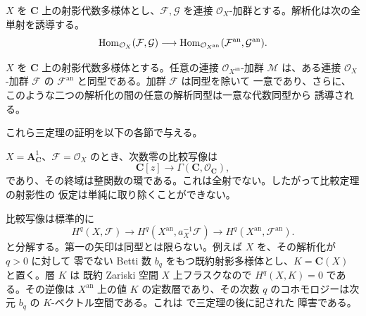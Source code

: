 \begin{theorem}[充満忠実性]
\label{theorem-gaga-fully-faithful}
\begin{reference}
\cite[\S 3、第12項、定理2]{GAGA}
\end{reference}
$X$ を $\mathbf C$ 上の射影代数多様体とし、$\mathcal F,\mathcal G$ を連接
$\mathcal O_X$-加群とする。解析化は次の全単射を誘導する。
$$
\mathop{\rm Hom}\nolimits_{\mathcal O_X}(\mathcal F,\mathcal G)
\longrightarrow
\mathop{\rm Hom}\nolimits_{\mathcal O_{X^{\mathrm{an}}}}
(\mathcal F^{\mathrm{an}},\mathcal G^{\mathrm{an}}).
$$
\end{theorem}

\begin{theorem}[本質的全射性]
\label{theorem-gaga-essential-surjectivity}
\begin{reference}
\cite[\S 3、第12項、定理3]{GAGA}
\end{reference}
$X$ を $\mathbf C$ 上の射影代数多様体とする。任意の連接
$\mathcal O_{X^{\mathrm{an}}}$-加群 $\mathcal M$ は、ある連接 $\mathcal O_X$-加群
$\mathcal F$ の $\mathcal F^{\mathrm{an}}$ と同型である。加群 $\mathcal F$ は同型を除いて
一意であり、さらに、このような二つの解析化の間の任意の解析同型は一意な代数同型から
誘導される。
\end{theorem}

これら三定理の証明を以下の各節で与える。

\begin{remark}[射影性の本質性]
\label{remark-gaga-projectivity-essential}
$X=\mathbf A^1_{\mathbf C}$、$\mathcal F=\mathcal O_X$ のとき、次数零の比較写像は
$$
\mathbf C[z]\longrightarrow
\Gamma(\mathbf C,\mathcal O_{\mathbf C}),
$$
であり、その終域は整関数の環である。これは全射でない。したがって比較定理の射影性の
仮定は単純に取り除くことができない。
\end{remark}

\begin{remark}[中間の逆像層]
\label{remark-gaga-comparison-factorization}
比較写像は標準的に
$$
H^q(X,\mathcal F)
\longrightarrow H^q(X^{\mathrm{an}},a_X^{-1}\mathcal F)
\longrightarrow H^q(X^{\mathrm{an}},\mathcal F^{\mathrm{an}}).
$$
と分解する。第一の矢印は同型とは限らない。例えば $X$ を、その解析化が $q>0$ に対して
零でない Betti 数 $b_q$ をもつ既約射影多様体とし、$K=\mathbf C(X)$ と置く。層 $K$ は
既約 Zariski 空間 $X$ 上フラスクなので $H^q(X,K)=0$ である。その逆像は
$X^{\mathrm{an}}$ 上の値 $K$ の定数層であり、その次数 $q$ のコホモロジーは次元 $b_q$ の
$K$-ベクトル空間である。これは \cite[\S 3、第12項]{GAGA} で三定理の後に記された
障害である。
\end{remark}

